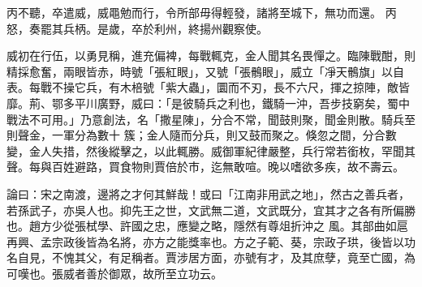 \begin{pinyinscope}
 丙不聽，卒遣威，威黽勉而行，令所部毋得輕發，諸將至城下，無功而還。
 丙怒，奏罷其兵柄。是歲，卒於利州，終揚州觀察使。



 威初在行伍，以勇見稱，進充偏裨，每戰輒克，金人聞其名畏憚之。臨陳戰酣，則精採愈奮，兩眼皆赤，時號「張紅眼」，又號「張鶻眼」，威立「凈天鶻旗」以自表。每戰不操它兵，有木棓號「紫大蟲」，圜而不刃，長不六尺，揮之掠陣，敵皆靡。荊、鄂多平川廣野，威曰：「是彼騎兵之利也，鐵騎一沖，吾步技窮矣，蜀中戰法不可用。」乃意創法，名「撒星陳」，分合不常，聞鼓則聚，聞金則散。騎兵至則聲金，一軍分為數十
 簇；金人隨而分兵，則又鼓而聚之。倏忽之間，分合數變，金人失措，然後縱擊之，以此輒勝。威御軍紀律嚴整，兵行常若銜枚，罕聞其聲。每與百姓避路，買食物則賈倍於市，迄無敢喧。晚以嗜欲多疾，故不壽云。



 論曰：宋之南渡，邊將之才何其鮮哉！或曰「江南非用武之地」，然古之善兵者，若孫武子，亦吳人也。抑先王之世，文武無二道，文武既分，宜其才之各有所偏勝也。趙方少從張栻學、許國之忠，應變之略，隱然有尊俎折沖之
 風。其部曲如扈再興、孟宗政後皆為名將，亦方之能獎率也。方之子範、葵，宗政子珙，後皆以功名自見，不愧其父，有足稱者。賈涉居方面，亦號有才，及其庶孽，竟至亡國，為可嘆也。張威者善於御眾，故所至立功云。



\end{pinyinscope}